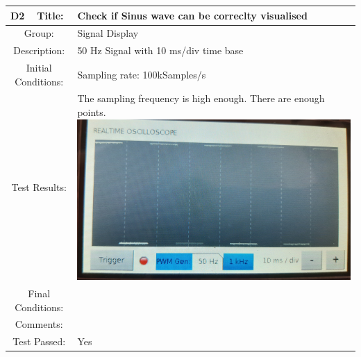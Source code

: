 \documentclass[12pt]{article}
\begin{document}
		\begin{table}[H]
	\begin{center}
		\begin{tabular}{| m{2cm}|m{2cm}|m{12cm}|}
			\hline 
			\bf D2&\bf Title:&\bf Check if Sinus wave can be correclty visualised\\ 
			\hline 
			\multicolumn{2}{|c|}{Group:}&Signal Display\\ 
			\hline 
			\multicolumn{2}{|c|}{Description:}&50 Hz Signal with 10 ms/div time base\\ 
			\hline 
			\multicolumn{2}{|c|}{Initial Conditions:}&Sampling rate: 100kSamples/s\\ 
			\hline 
			\multicolumn{2}{|c|}{Test Results:}&The sampling frequency is high enough. There are enough points.
			\includegraphics[scale=0.08]{Ressources/PWM_10ms}\\ 
			\hline 
			\multicolumn{2}{|c|}{Final Conditions:}&\\ 
			\hline 
			\multicolumn{2}{|c|}{Comments:}&\\ 
			\hline 
			\multicolumn{2}{|c|}{Test Passed:}&Yes \\ 
			\hline 
		\end{tabular} 
	\end{center}
\end{table}	
\end{document}
